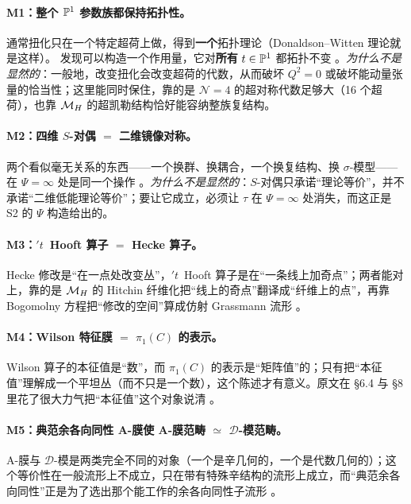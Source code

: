\paragraph{M1：整个 $\mathbb{P}^1$ 参数族都保持拓扑性。}
通常扭化只在一个特定超荷上做，得到\textbf{一个}拓扑理论（Donaldson--Witten 理论就是这样）。\kw{} 发现可以构造一个作用量，它对\textbf{所有} $t\in\mathbb{P}^1$ 都拓扑不变 \pA{}。\emph{为什么不是显然的}：一般地，改变扭化会改变超荷的代数，从而破坏 $Q^2=0$ 或破坏能动量张量的恰当性；这里能同时保住，靠的是 $\mathcal{N}=4$ 的超对称代数足够大（16 个超荷），也靠 $\mathcal{M}_H$ 的超凯勒结构恰好能容纳整族复结构。

\paragraph{M2：四维 $S$-对偶 $=$ 二维镜像对称。}
两个看似毫无关系的东西——一个换群、换耦合，一个换复结构、换 $\sigma$-模型——在 $\Psi=\infty$ 处是同一个操作 \pA{}。\emph{为什么不是显然的}：$S$-对偶只承诺“理论等价”，并不承诺“二维低能理论等价”；要让它成立，必须让 $\tau$ 在 $\Psi=\infty$ 处消失，而这正是 S2 的 $\Psi$ 构造给出的。

\paragraph{M3：$'t$~Hooft 算子 $=$ Hecke 算子。}
Hecke 修改是“在一点处改变丛”，$'t$~Hooft 算子是在“一条线上加奇点”；两者能对上，靠的是 $\mathcal{M}_H$ 的 Hitchin 纤维化把“线上的奇点”翻译成“纤维上的点”，再靠 Bogomolny 方程把“修改的空间”算成仿射 Grassmann 流形 。

\paragraph{M4：Wilson 特征膜 $=$ $\pi_1(C)$ 的表示。}
Wilson 算子的本征值是“数”，而 $\pi_1(C)$ 的表示是“矩阵值”的；只有把“本征值”理解成一个平坦丛（而不只是一个数），这个陈述才有意义。原文在 \S6.4 与 \S8 里花了很大力气把“本征值”这个对象说清 。

\paragraph{M5：典范余各向同性 A-膜使 A-膜范畴 $\simeq$ $\mathcal{D}$-模范畴。}
A-膜与 $\mathcal{D}$-模是两类完全不同的对象（一个是辛几何的，一个是代数几何的）；这个等价性在一般流形上不成立，只在带有特殊辛结构的流形上成立，而“典范余各向同性”正是为了选出那个能工作的余各向同性子流形 。

